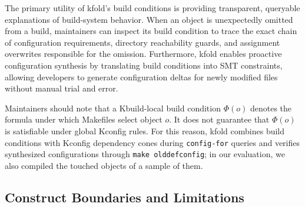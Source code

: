 \documentclass[acmsmall]{acmart}
\newcommand{\tool}{\textsf{kfold}\xspace}
\begin{document}
The primary utility of \tool's build conditions is providing transparent, queryable explanations of build-system behavior.
When an object is unexpectedly omitted from a build, maintainers can inspect its build condition to trace the exact chain of configuration requirements, directory reachability guards, and assignment overwrites responsible for the omission.
Furthermore, \tool enables proactive configuration synthesis by translating build conditions into SMT constraints, allowing developers to generate configuration deltas for newly modified files without manual trial and error.

Maintainers should note that a Kbuild-local build condition $\Phi(o)$ denotes the formula under which Makefiles select object $o$.
It does not guarantee that $\Phi(o)$ is satisfiable under global Kconfig rules.
For this reason, \tool combines build conditions with Kconfig dependency cones during \texttt{config-for} queries and verifies synthesized configurations through \texttt{make olddefconfig}; in our evaluation, we also compiled the touched objects of a sample of them.

\subsection{Construct Boundaries and Limitations}\label{sec:discussion:limitations}
\end{document}
